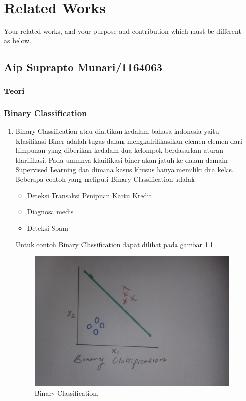 \chapter{Related Works}

Your related works, and your purpose and contribution which must be different as below.

\section{Aip Suprapto Munari/1164063}
\subsection{Teori}
\subsection{Binary Classification}
\begin{enumerate}
\item Binary Classification atau diartikan kedalam bahasa indonesia yaitu Klasifikasi Biner adalah tugas dalam mengkalrifikasikan elemen-elemen dari himpunan yang diberikan kedalam dua kelompok berdasarkan aturan klarifikasi. Pada ummnya klarifikasi biner akan jatuh ke dalam domain Supervised Learning dan dimana kasus khusus hanya memiliki dua kelas. Beberapa contoh yang meliputi Binary Classification adalah \begin{itemize}
		\item Deteksi Transaksi Penipuan Kartu Kredit
		\item Diagnosa medis
		\item Deteksi Spam
	\end{itemize}
\subitem Untuk contoh Binary Classification dapat dilihat pada gambar \ref{1}
		\begin{figure}[!hbtp]
		\centerline{\includegraphics[width=1\textwidth]{figures/AIP/1.JPEG}}
		\caption{Binary Classification.}
		\label{1}
		\end{figure}
 \end{enumerate}

